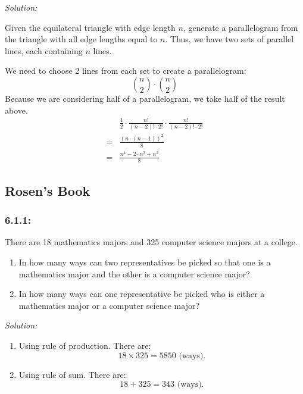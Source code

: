 \documentclass[a4paper]{article}
\begin{document}
	\textit{Solution:}
	
	Given the equilateral triangle with edge length $n$, generate a parallelogram from the triangle with all edge lengths equal to $n$. Thus, we have two sets of parallel lines, each containing $n$ lines.
	
	We need to choose 2 lines from each set to create a parallelogram:
	\begin{equation*}
	{n \choose 2} \cdot {n \choose 2}
	\end{equation*}
	Because we are considering half of a parallelogram, we take half of the result above.
	\begin{align*}
	&\frac{1}{2} \cdot \frac{n!}{(n - 2)! \cdot 2!} \cdot \frac{n!}{(n - 2)! \cdot 2!} \\
	= &\frac{(n \cdot (n - 1))^2}{8} \\
	= &\frac{n^4 - 2 \cdot n^3 + n^2}{8} 
	\end{align*}
	
	\subsection*{Rosen's Book}
	\subsubsection*{6.1.1:}There are 18 mathematics majors and 325 computer science majors at a college.
	\begin{enumerate}[label = \textbf{\alph*)}]
	    \item  In how many ways can two representatives be picked so that one is a mathematics major and the other is a computer science major?
	    \item In how many ways can one representative be picked who is either a mathematics major or a computer science major?

	\end{enumerate}
	\textit{Solution:}\\
	\begin{enumerate}[label = \textbf{\alph*)}]
	    \item Using rule of production. There are:
	    \begin{equation*}
	        18 \times 325 = 5850 \text{ (ways).}
	    \end{equation*}
	    \item Using rule of sum. There are:
	    \begin{equation*}
	        18 + 325 = 343 \text{ (ways).}
	    \end{equation*}
	\end{enumerate}
\end{document}
